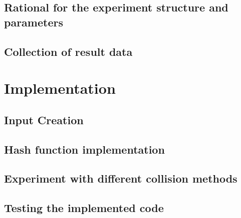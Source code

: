 \subsection{Rational for the experiment structure and parameters}

\subsection{Collection of result data}

\section{Implementation}

\subsection{Input Creation}

\subsection{Hash function implementation}

\subsection{Experiment with different collision methods}

\subsection{Testing the implemented code}
